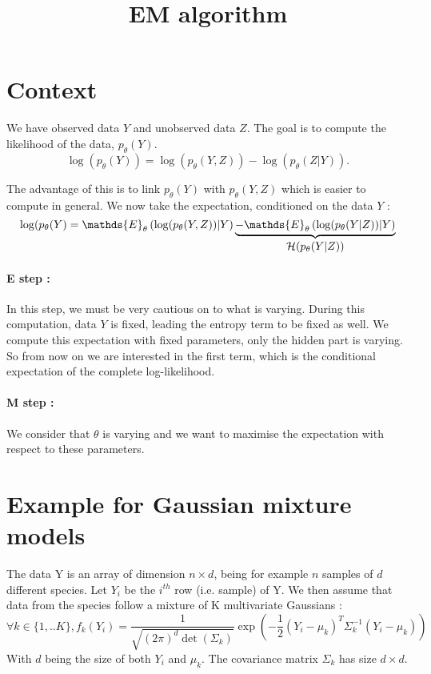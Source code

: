 \documentclass[a4paper,10pt]{article}
\title{EM algorithm}
\author{}
\begin{document}
\maketitle



\section{Context}

We have observed data $Y$ and unobserved data $Z$. The goal is to compute the likelihood of the data, $p_\theta (Y)$.
\[ \log(p_\theta (Y)) = \log (p_\theta (Y,Z)) - \log(p_\theta (Z|Y)).\]

The advantage of this is to link $p_\theta(Y)$ with $p_\theta (Y,Z)$ which is easier to compute in general. We now take the expectation,
conditioned on the data $Y$ :
\[ \log(p_\theta (Y) = \mathds{E}_\theta \left(\log(p_\theta (Y,Z))|Y \right) \underbrace{- \mathds{E}_\theta \left(\log(p_\theta (Y|Z))|Y \right)}_{\text{\normalsize{$\mathcal{H}(p_\theta (Y|Z))$}}} \]

\paragraph{E step :}
In this step, we must be very cautious on to what is varying. During this computation, data $Y$ is fixed, leading the entropy term to be fixed as well.
We compute this expectation with fixed parameters, only the hidden part is varying. So from now on we are interested in the first term, which is the conditional expectation of the complete log-likelihood. \\

\paragraph{M step :}
We consider that  $\theta$ is varying and we want to maximise the expectation with respect to these parameters.


\section{Example for Gaussian mixture models}
The data Y is an array of dimension $n\times d$, being for example $n$ samples of $d$ different species. Let
$Y_i$ be the $i^{th}$ row (i.e. sample) of Y. We then assume that data from the species follow a mixture of K multivariate Gaussians :
\[\forall k\in\{1,..K\}, f_k(Y_i) = \frac{1}{\sqrt{(2\pi)^d\det(\Sigma_k)}}\exp\left(-\frac{1}{2}(Y_i - \mu_k)^T\Sigma_k^{-1}(Y_i - \mu_k)\right)\]
With $d$ being the size of both $Y_i$ and $\mu_k$. The covariance matrix $\Sigma_k$ has size $d\times d$.\\
\end{document}
